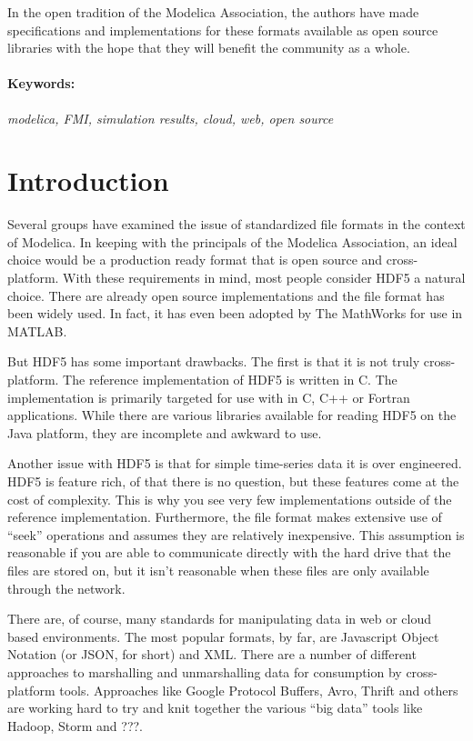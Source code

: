 \documentclass[11pt,a4paper,twocolumn]{article}
\begin{document}
In the open tradition of the Modelica Association, the authors have
made specifications and implementations for these formats available as
open source libraries with the hope that they will benefit the
community as a whole.

\paragraph{Keywords:}\emph{modelica, FMI, simulation results,
  cloud, web, open source}

\section{Introduction}
\label{sec:intro}

Several groups have examined the issue of standardized file formats
\cite{AndreasHDF5,GallHDF5} in the context of Modelica.  In keeping
with the principals of the Modelica Association, an ideal choice would
be a production ready format that is open source and cross-platform.
With these requirements in mind, most people consider HDF5 a natural
choice.  There are already open source implementations and the file
format has been widely used.  In fact, it has even been adopted by The
MathWorks for use in MATLAB.

But HDF5 has some important drawbacks.  The first is that it is not
truly cross-platform.  The reference implementation of HDF5 is written
in C.  The implementation is primarily targeted for use with in C, C++
or Fortran applications.  While there are various libraries available
for reading HDF5 on the Java platform\cite{HDFJava}, they are
incomplete and awkward to use.

Another issue with HDF5 is that for simple time-series data it is over
engineered.  HDF5 is feature rich, of that there is no question, but
these features come at the cost of complexity.  This is why you see
very few implementations outside of the reference implementation.
Furthermore, the file format makes extensive use of ``seek''
operations and assumes they are relatively inexpensive.  This
assumption is reasonable if you are able to communicate directly with
the hard drive that the files are stored on, but it isn't reasonable
when these files are only available through the network.

There are, of course, many standards for manipulating data in web or
cloud based environments.  The most popular formats, by far, are
Javascript Object Notation (or JSON, for short) and XML.  There are a
number of different approaches to marshalling and unmarshalling data
for consumption by cross-platform tools.  Approaches like Google
Protocol Buffers\cite{GPB}, Avro\cite{Avro}, Thrift\cite{Thrift} and
others are working hard to try and knit together the various ``big
data'' tools like Hadoop\cite{Hadoop}, Storm\cite{Storm} and ???.
\end{document}
